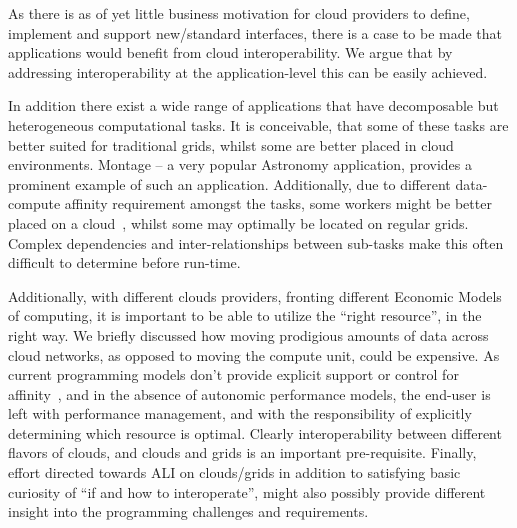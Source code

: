\documentclass[3p,twocolumn]{elsarticle}
\begin{document}

As there is as of yet little business motivation for cloud providers to
define, implement and support new/standard interfaces, there is a case
to be made that applications would benefit from cloud interoperability.
We argue that by addressing interoperability at the application-level
this can be easily achieved.    

In addition there exist a wide range of applications that have
decomposable but heterogeneous computational tasks. It is conceivable,
that some of these tasks are better suited for traditional grids, whilst
some are better placed in cloud environments. Montage -- a very popular
Astronomy application, provides a prominent example of such an
application.  Additionally, due to different data-compute affinity
requirement amongst the tasks, some workers might be better placed on
a cloud~\cite{jha_ccpe09}, whilst some may optimally be located on
regular grids.  Complex dependencies and
inter-relationships between sub-tasks make this often difficult to
determine before run-time.

Additionally, with different clouds providers, fronting different
Economic Models of computing, it is important to be able to utilize the
``right resource'', in the right way. We briefly discussed how moving
prodigious amounts of data across cloud networks, as opposed to moving
the compute unit, could be expensive.  As current programming models
don't provide explicit support or control for
affinity~\cite{jha_ccpe09}, and in the absence of autonomic performance
models, the end-user is left with performance management, and with the
responsibility of explicitly determining which resource is optimal.
Clearly interoperability between different flavors of clouds, and
clouds and grids is an important pre-requisite.  Finally, effort
directed towards ALI on clouds/grids in addition to satisfying basic
curiosity of ``if and how to interoperate'', might also possibly provide
different insight into the programming challenges and requirements.
\end{document}
